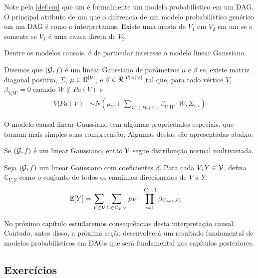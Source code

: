 Note pela \cref{def:cm} que
um \CM é formalmente um modelo probabilístico em um DAG.
O principal atributo de um \CM que 
o diferencia de um modelo probabilístico genérico em um DAG é
como o interpretamos.
Existe uma aresta de $V_1$ em $V_2$ em um \CM
se e somente se $V_1$ é uma causa direta de $V_2$.

Dentre os modelos causais, 
é de particular interesse
o modelo linear Gaussiano.

\begin{definition}
 \label{def:cm_linear}
 Dizemos que $({\mathcal G},f)$ é um \CM linear Gaussiano 
 de parâmetros $\mu$ e $\beta$ se,
 existe matriz diagonal positiva, $\Sigma$, 
 $\mu \in \Re^{|{\mathcal V}|}$, e
 $\beta \in \Re^{|{\mathcal V}| \times |{\mathcal V}|}$ tal que,
 para todo vértice $V$,
 $\beta_{V,W} = 0$ quando $W \notin Pa(V)$ e
 \begin{align*}
  V|Pa(V) &\sim N\left(\mu_V + \sum_{W \in Pa(V)} \beta_{V,W} \cdot W, \Sigma_{i,i}\right)
 \end{align*}
\end{definition}

O modelo causal linear Gaussiano tem
algumas propriedades especiais, que
tornam mais simples suas compreensão.
Algumas destas são apresentadas abaixo:

\begin{lemma}
 \label{lemma:cm_linear_normal}
 Se $({\mathcal G},f)$ é um \CM linear Gaussiano, então
 ${\mathcal V}$ segue distribuição normal multivariada.
\end{lemma}

\begin{lemma}
 \label{lemma:cm_linear_esp}
 Seja $({\mathcal G},f)$ um \CM linear Gaussiano com coeficientes $\beta$.
 Para cada $V, Y \in {\mathcal V}$, defina $\mathbb{C}_{V,Y}$ como 
 o conjunto de todos os caminhos direcionados de $V$ a $Y$.
 \begin{align*}
  {\mathbb E}[Y] &= \sum_{V \in \mathbb{{\mathcal V}}} 
  \sum_{C \in \mathbb{C}_{V,Y}}
  \mu_V \cdot \prod_{i=1}^{|C|-1} \beta_{C_{i+1},C_i}
 \end{align*}
\end{lemma}

No próximo capítulo estudaremos consequências desta interpretação causal.
Contudo, antes disso, a próxima seção desenvolverá
um resultado fundamental de modelos probabilísticos em DAGs que
será fundamental nos capítulos posteriores.

\subsection{Exercícios}

